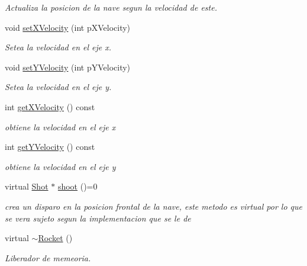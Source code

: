 \begin{DoxyCompactItemize}
\begin{DoxyCompactList}\small\item\em Actualiza la posicion de la nave segun la velocidad de este. \end{DoxyCompactList}\item 
void \hyperlink{class_rocket_ab381b27dd79eee5817dd61e46accd512}{set\-X\-Velocity} (int p\-X\-Velocity)
\begin{DoxyCompactList}\small\item\em Setea la velocidad en el eje x. \end{DoxyCompactList}\item 
void \hyperlink{class_rocket_a27e02e296aeff2b15b3bc0f09c0c6b1c}{set\-Y\-Velocity} (int p\-Y\-Velocity)
\begin{DoxyCompactList}\small\item\em Setea la velocidad en el eje y. \end{DoxyCompactList}\item 
int \hyperlink{class_rocket_a326aa42ccf341047a3009382e81eef7d}{get\-X\-Velocity} () const 
\begin{DoxyCompactList}\small\item\em obtiene la velocidad en el eje x \end{DoxyCompactList}\item 
int \hyperlink{class_rocket_a981cf7e9bdf4f48adcf987f9a97d09e8}{get\-Y\-Velocity} () const 
\begin{DoxyCompactList}\small\item\em obtiene la velocidad en el eje y \end{DoxyCompactList}\item 
virtual \hyperlink{class_shot}{Shot} $\ast$ \hyperlink{class_rocket_a5164f5926f96291b57da2516d46262e8}{shoot} ()=0
\begin{DoxyCompactList}\small\item\em crea un disparo en la posicion frontal de la nave, este metodo es virtual por lo que se vera sujeto segun la implementacion que se le de \end{DoxyCompactList}\item 
\hypertarget{class_rocket_ab0cbe044146250c3e592832bb4909ff9}{virtual \hyperlink{class_rocket_ab0cbe044146250c3e592832bb4909ff9}{$\sim$\-Rocket} ()}\label{class_rocket_ab0cbe044146250c3e592832bb4909ff9}

\begin{DoxyCompactList}\small\item\em Liberador de memeoria. \end{DoxyCompactList}\end{DoxyCompactItemize}

